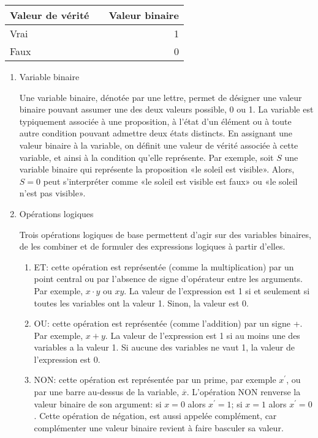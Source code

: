 \documentclass[letter, oneside]{book}
\begin{document}
\begin{center}
\begin{tabular}{llr}
Valeur de vérité &  & Valeur binaire\\[0pt]
\hline
Vrai &  & 1\\[0pt]
Faux &  & 0\\[0pt]
\end{tabular}
\end{center}


\begin{enumerate}
\item Variable binaire
\label{sec:org4ee6cfe}

Une variable binaire, dénotée par une lettre, permet de désigner une
valeur binaire pouvant assumer une des deux valeurs possible, 0
ou 1. La variable est typiquement associée à une proposition, à l'état
d'un élément ou à toute autre condition pouvant admettre deux états
distincts. En assignant une valeur binaire à la variable, on définit
une valeur de vérité associée à cette variable, et ainsi à la
condition qu'elle représente. Par exemple, soit \(S\) une variable
binaire qui représente la proposition «le soleil est visible». Alors,
\(S=0\) peut s'interpréter comme «le soleil est visible est faux» ou
«le soleil n'est pas visible».

\item Opérations logiques
\label{sec:org1ee5397}

Trois opérations logiques de base permettent d'agir sur des variables
binaires, de les combiner et de formuler des expressions logiques à
partir d'elles.

\begin{enumerate}
\item ET: cette opération est représentée (comme la multiplication) par
un point central ou par l'absence de signe d'opérateur entre les
arguments. Par exemple, \(x \cdot y\) ou \(x y\). La valeur de
l'expression est 1 si et seulement si toutes les variables ont la
valeur 1. Sinon, la valeur est 0.
\item OU: cette opération est représentée (comme l'addition) par un signe
+. Par exemple, \(x + y\). La valeur de l'expression est 1 si au
moins une des variables a la valeur 1. Si aucune des variables ne
vaut 1, la valeur de l'expression est 0.
\item NON: cette opération est représentée par un prime, par
exemple \(x^\prime\), ou par une barre au-dessus de la variable,
\(\overline{x}\).  L'opération NON renverse la valeur binaire de
son argument: si \(x =0\) alors \(x^ \prime = 1\); si \(x =1\)
alors \(x^ \prime = 0\). Cette opération de négation, est aussi
appelée complément, car complémenter une valeur binaire revient à
faire basculer sa valeur.
\end{enumerate}


\end{enumerate}
\end{document}
